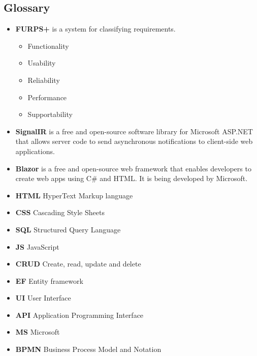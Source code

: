 \documentclass{scrartcl}
\begin{document}
\subsection{Glossary}
\begin{itemize}


\item \textbf{FURPS+}\cite{eeles2005capturing} is a system for classifying requirements.
\begin{itemize}
\item Functionality
\item Usability
\item Reliability
\item Performance
\item Supportability 
\end{itemize}


\item \textbf{ SignalIR} is a free and open-source software library for Microsoft ASP.NET that allows server code to send asynchronous notifications to client-side web applications. 

\item \textbf{Blazor} is a free and open-source web framework that enables developers to create web apps using C\# and HTML. It is being developed by Microsoft.

\item \textbf{HTML} HyperText Markup language

\item \textbf{CSS} Cascading Style Sheets
\item \textbf{SQL} Structured Query Language
\item \textbf{JS } JavaScript
\item \textbf{CRUD} Create, read, update and delete
\item \textbf{EF} Entity framework
\item \textbf{UI} User Interface
\item \textbf{API} Application Programming Interface 

\item \textbf{MS} Microsoft
\item \textbf{BPMN} Business Process Model and Notation



\end{itemize}
\end{document}

